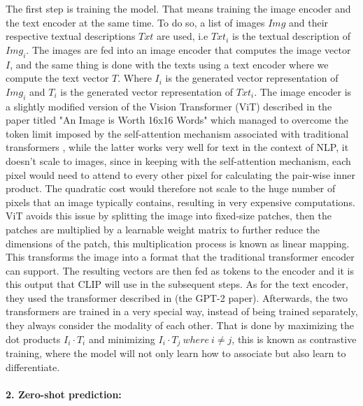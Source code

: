 \documentclass[a4paper,11pt,oneside]{article}
\begin{document}
  The first step is training the model. That means training the image encoder and the text encoder at the same time. To do so, a list of images $Img$ and their respective textual descriptions $Txt$ are used, i.e $Txt_i$ is the textual description of $Img_i$. The images are fed into an image encoder that computes the image vector $I$, and the same thing is done with the texts using a text encoder where we compute the text vector $T$. Where $I_i$ is the generated vector representation of $Img_i$ and $T_i$ is the generated vector representation of $Txt_i$. The image encoder is a slightly modified version of the Vision Transformer (ViT) described in the paper titled "An Image is Worth 16x16 Words" \cite{dosovitskiy2021image} which managed to overcome the token limit imposed by the self-attention mechanism associated with traditional transformers \cite{vaswani2017attention}, while the latter works very well for text in the context of NLP, it doesn't scale to images, since in keeping with the self-attention mechanism, each pixel would need to attend to every other pixel for calculating the pair-wise inner product. The quadratic cost would therefore not scale to the huge number of pixels that an image typically contains, resulting in very expensive computations. ViT avoids this issue by splitting the image into fixed-size patches, then the patches are multiplied by a learnable weight matrix to further reduce the dimensions of the patch, this multiplication process is known as linear mapping. This transforms the image into a format that the traditional transformer encoder can support. The resulting vectors are then fed as tokens to the encoder and it is this output that CLIP will use in the subsequent steps. As for the text encoder, they used the transformer described in \cite{Radford2019} (the GPT-2 paper). Afterwards, the two transformers are trained in a very special way, instead of being trained separately, they always consider the modality of each other. That is done by maximizing the dot products $I_i\cdot T_i$ and minimizing $I_i\cdot T_j \: where \: i \neq j$, this is known as contrastive training, where the model will not only learn how to associate but also learn to differentiate. 
  \\ \\
  \textbf{2. Zero-shot prediction:}
  \\
\end{document}
